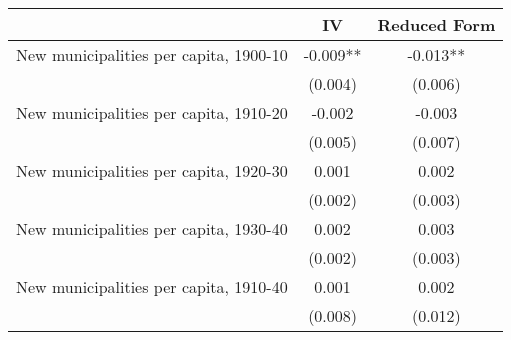  \begin{tabular}{l*{2}{c}} \toprule
                &\multicolumn{1}{c}{IV}&\multicolumn{1}{c}{Reduced Form}\\
\midrule
New municipalities per capita, 1900-10&   -0.009** &   -0.013** \\
                &  (0.004)   &  (0.006)   \\
\addlinespace
New municipalities per capita, 1910-20&   -0.002   &   -0.003   \\
                &  (0.005)   &  (0.007)   \\
\addlinespace
New municipalities per capita, 1920-30&    0.001   &    0.002   \\
                &  (0.002)   &  (0.003)   \\
\addlinespace
New municipalities per capita, 1930-40&    0.002   &    0.003   \\
                &  (0.002)   &  (0.003)   \\
\addlinespace
New municipalities per capita, 1910-40&    0.001   &    0.002   \\
                &  (0.008)   &  (0.012)   \\
       \bottomrule \end{tabular}
